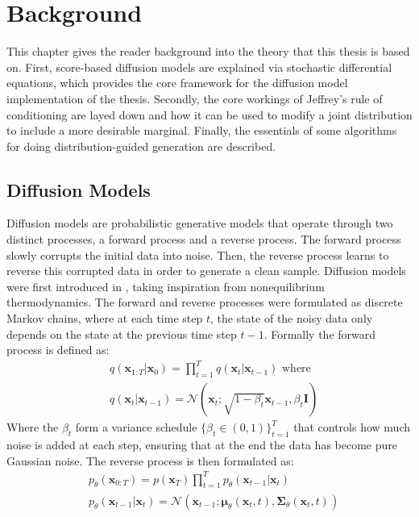 \chapter{Background} \label{sec:background}
This chapter gives the reader background into the theory that this thesis is based on. First, score-based diffusion models are explained via stochastic differential equations, which provides the core framework for the diffusion model implementation of the thesis. Secondly, the core workings of Jeffrey's rule of conditioning are layed down and how it can be used to modify a joint distribution to include a more desirable marginal. Finally, the essentials of some algorithms for doing distribution-guided generation are described.
\section{Diffusion Models}
Diffusion models are probabilistic generative models that operate through two distinct processes, a forward process and a reverse process. The forward process slowly corrupts the initial data into noise. Then, the reverse process learns to reverse this corrupted data in order to generate a clean sample. Diffusion models were first introduced in \cite{sohldickstein2015deepunsupervisedlearningusing}, taking inspiration from nonequilibrium thermodynamics. The forward and reverse processes were formulated as discrete Markov chains, where at each time step $t$, the state of the noisy data only depends on the state at the previous time step $t - 1$. Formally the forward process is defined as:
\begin{align*}
	&q(\mathbf{x}_{1:T} | \mathbf{x}_0) = \prod_{t=1}^T q(\mathbf{x}_t | \mathbf{x}_{t-1}) \text{ where }\\
	&q(\mathbf{x}_t | \mathbf{x}_{t-1}) = \mathcal{N}(\mathbf{x}_t; \sqrt{1 - \beta_t} \mathbf{x}_{t-1}, \beta_t \mathbf{I})
\end{align*}
Where the $\beta_t$ form a variance schedule $\{\beta_t \in (0, 1)\}^T_{t=1}$ that controls how much noise is added at each step, ensuring that at the end the data has become pure Gaussian noise. The reverse process is then formulated as:
\begin{align*}
	&p_\theta(\mathbf{x}_{0:T}) = p(\mathbf{x}_T) \prod_{t=1}^T p_\theta(\mathbf{x}_{t-1} | \mathbf{x}_t)\\
	&p_\theta(\mathbf{x}_{t-1} | \mathbf{x}_t) = \mathcal{N}(\mathbf{x}_{t-1}; \boldsymbol{\mu}_\theta(\mathbf{x}_t, t), \boldsymbol{\Sigma}_\theta(\mathbf{x}_t, t))
\end{align*}
